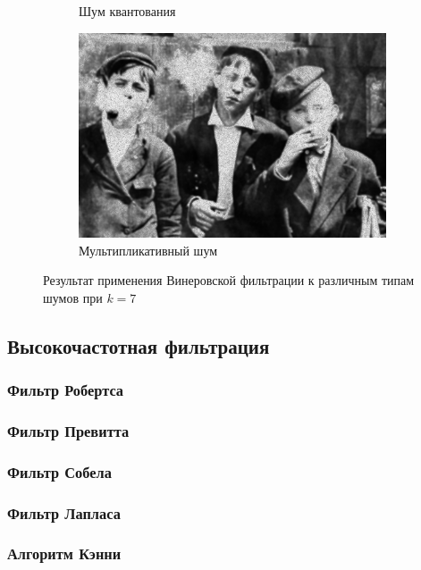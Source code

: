 \begin{figure}[ht]
\begin{subfigure}[b]{0.5\linewidth}
      \caption{Шум квантования} 
      \label{weiner_7:e}
    \end{subfigure}%
    \begin{subfigure}[b]{0.5\linewidth}
        \centering
        \includegraphics[width=0.95\linewidth]{../Wiener_Filter/Wiener_Speckle_noise_(k=7).jpg} 
        \caption{Мультипликативный шум} 
        \label{weiner_7:f} 
    \end{subfigure} 
    \caption{Результат применения Винеровской фильтрации к различным типам шумов при $k = 7$}
    \label{img:weiner_7} 
\end{figure}
\FloatBarrier


\subsection{Высокочастотная фильтрация}
\subsubsection{Фильтр Робертса}
\newpage
\subsubsection{Фильтр Превитта}
\subsubsection{Фильтр Собела}
\subsubsection{Фильтр Лапласа}
\subsubsection{Алгоритм Кэнни}
